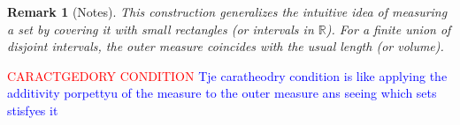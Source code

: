\documentclass[10pt, oneside]{article}
\newenvironment{remarkbox}[1][]{\begin{rembox}\begin{rem}[#1]}{\end{rem}\end{rembox}}
\numberwithin{equation}{section}
\newtheorem{rem}{Remark}
\begin{document}
\begin{remarkbox}[Notes]
This construction generalizes the intuitive idea of measuring a set 
by covering it with small rectangles (or intervals in $\mathbb{R}$). 
For a finite union of disjoint intervals, the outer measure coincides 
with the usual length (or volume).
\end{remarkbox}


\textcolor{red}{CARACTGEDORY CONDITION}
\textcolor{blue}{Tje caratheodry condition is like applying the additivity porpettyu of the measure
to the outer measure ans seeing which sets stisfyes it }
\end{document}
